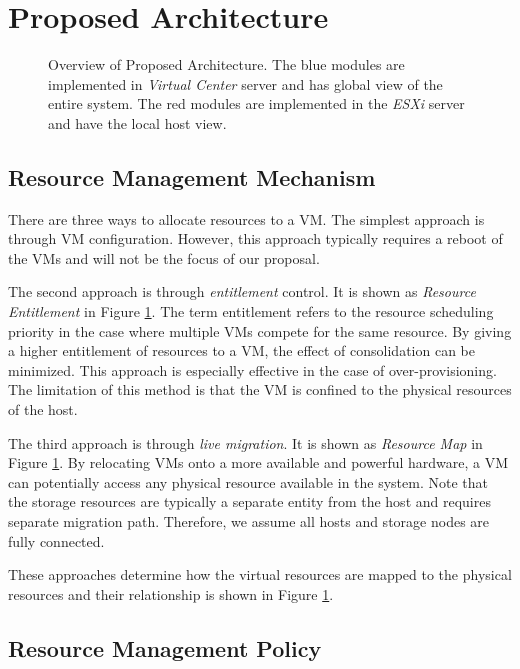 \section{Proposed Architecture}
\label{sec:technical}
% 
\begin{figure}[t]
\centering

\caption{Overview of Proposed Architecture. The blue modules are implemented in \emph{Virtual Center} server and has global view of the entire system. The red modules are implemented in the \emph{ESXi} server and have the local host view.}
\label{arch}
\end{figure}

\subsection{Resource Management Mechanism}

There are three ways to allocate resources to a VM. 
The simplest approach is through VM configuration. 
However, this approach typically requires a reboot of the VMs and will not be the focus of our proposal. 

The second approach is through \emph{entitlement} control.
It is shown as \emph{Resource Entitlement} in Figure \ref{arch}.
The term entitlement refers to the resource scheduling priority in the case where multiple VMs compete for the same resource\cite{parda}.
By giving a higher entitlement of resources to a VM, the effect of consolidation can be minimized.
This approach is especially effective in the case of over-provisioning.
The limitation of this method is that the VM is confined to the physical resources of the host. 

The third approach is through \emph{live migration}. 
It is shown as \emph{Resource Map} in Figure \ref{arch}.
By relocating VMs onto a more available and powerful hardware, a VM can potentially access any physical resource available in the system. 
Note that the storage resources are typically a separate entity from the host and requires separate migration path. 
Therefore, we assume all hosts and storage nodes are fully connected. 

These approaches determine how the virtual resources are mapped to the physical resources and their relationship is shown in Figure \ref{arch}.

\subsection{Resource Management Policy}


